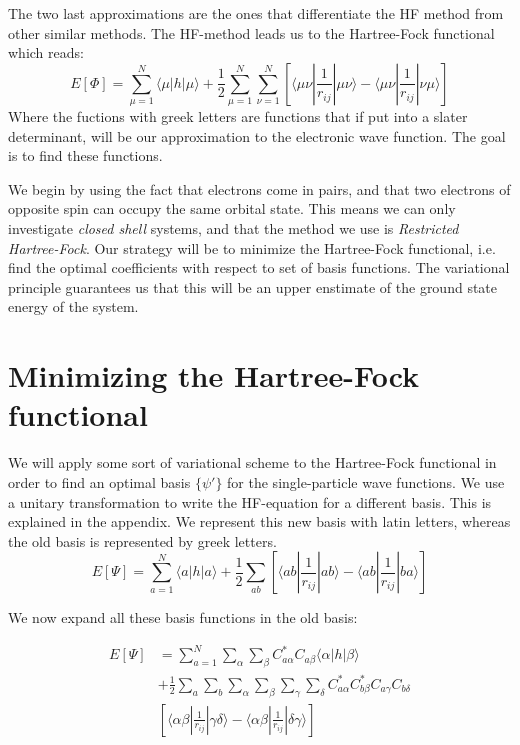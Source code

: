 \documentclass[a4paper,10pt, twocolumn, pre]{revtex4}
\begin{document}
The two last approximations are the ones that differentiate the HF method from other similar methods. The HF-method leads us to the Hartree-Fock functional which reads:
\begin{equation}
	E[\Phi] = \sum_{\mu = 1}^N \langle \mu |h|\mu \rangle + \frac{1}{2} \sum_{\mu = 1}^N\sum_{\nu=1}^N \left[ \langle \mu\nu |\frac{1}{r_{ij}}| \mu\nu\rangle - \langle \mu\nu |\frac{1}{r_{ij}}| \nu\mu\rangle \right]
\end{equation}
Where the fuctions with greek letters are functions that if put into a slater determinant, will be our approximation to the electronic wave function. The goal is to find these functions. 

We begin by using the fact that electrons come in pairs, and that two electrons of opposite spin can occupy the same orbital state. This means we can only investigate \emph{closed shell} systems, and that the method we use is \emph{Restricted Hartree-Fock}. Our strategy will be to minimize the Hartree-Fock functional, i.e. find the optimal coefficients with respect to set of basis functions. The variational principle guarantees us that this will be an upper enstimate of the ground state energy of the system.



\section{Minimizing the Hartree-Fock functional}
We will apply some sort of variational scheme to the Hartree-Fock functional in order to find an optimal basis $\{\psi'\}$ for the single-particle wave functions. We use a unitary transformation to write the HF-equation for a different basis. This is explained in the appendix. We represent this new basis with latin letters, whereas the old basis is represented by greek letters. 
\begin{equation}
	E[\Psi] = \sum_{a=1}^N \langle a|h|a \rangle + \frac{1}{2} \sum_{ab}\left[  \langle ab |\frac{1}{r_{ij}}|ab \rangle - \langle ab | \frac{1}{r_{ij} }| ba\rangle \right]
\end{equation}

We now expand all these basis functions in the old basis:

\begin{align}
	E[\Psi] &= \sum_{a=1}^N \sum_\alpha \sum_\beta C_{a\alpha}^* C_{a\beta}\langle \alpha |h|\beta\rangle
	\nonumber \\
	&+
	\frac{1}{2} \sum_a \sum_b \sum_\alpha \sum_\beta \sum_\gamma \sum_\delta 
	C^*_{a\alpha} C^*_{b\beta} C_{a\gamma} C_{b\delta} \nonumber \\
	&\left[  \langle \alpha\beta |\frac{1}{r_{ij}}|\gamma\delta \rangle - \langle \alpha\beta | \frac{1}{r_{ij} }| \delta\gamma \rangle \right]
\end{align}
\end{document}
